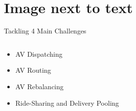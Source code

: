 \section[Example 1]{Image next to text }

\begin{frame}{Tackling 4 Main Challenges}
	\begin{columns}
		\begin{column}{0.4\textwidth}
			
			\begin{itemize}
				\item \alert<1>{AV Dispatching}
				\item \alert<2>{AV Routing}
				\item \alert<3>{AV Rebalancing}
				\item \alert<4>{Ride-Sharing and Delivery Pooling}
			\end{itemize}
			
				
		\end{column}
		\begin{column}{0.6\textwidth}
			\only<1>{ %
				
			}
			\only<2>{ %
				
			}
			\only<3>{ %
				
			}
			\only<4>{ %
				
			}
		\end{column}
	\end{columns}
\end{frame}

